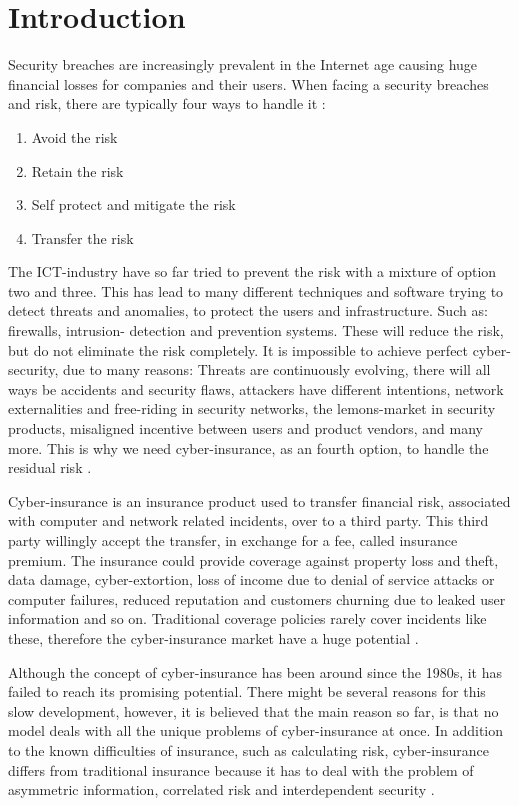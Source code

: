 \section{Introduction}
Security breaches are increasingly prevalent in the Internet age causing huge financial losses
for companies and their users. When facing a security breaches and risk, there are typically four ways to handle it \cite{bolot2008new}:
\begin{enumerate}
\item Avoid the risk
\item Retain the risk
\item Self protect and mitigate the risk
\item Transfer the risk
\end{enumerate}
The ICT-industry have so far tried to prevent the risk with a mixture of option two and three. This has lead to many different techniques and software trying to detect threats and anomalies, to protect the users and infrastructure. Such as: firewalls, intrusion- detection and prevention systems. These will reduce the risk, but do not eliminate the risk completely. It is impossible to achieve perfect cyber-security, due to many reasons: Threats are continuously evolving, there will all ways be accidents and security flaws, attackers have different intentions, network externalities and free-riding in security networks, the lemons-market in security products, misaligned incentive between users and product vendors, and many more. 
This is why we need cyber-insurance, as an fourth option, to handle the residual risk \cite{lelarge2009economic,paldifferentiating}.

Cyber-insurance is an insurance product used to transfer financial risk, associated with computer and network related incidents, over to a third party. This third party willingly accept the transfer, in exchange for a fee, called insurance premium.
The insurance could provide coverage against property loss and theft, data damage, cyber-extortion, loss of income due to denial of service attacks or computer failures, reduced reputation and customers churning due to leaked user information and so on. Traditional coverage policies rarely cover incidents like these, therefore the cyber-insurance market have a huge potential \cite{washingtonpaper}.

Although the concept of cyber-insurance has been around since the 1980s, it has failed to reach its promising potential. There might be several reasons for this slow development, however, it is believed that the main reason so far, is that no model deals with all the unique problems of cyber-insurance at once. In addition to the known difficulties of insurance, such as calculating risk, cyber-insurance differs from traditional insurance because it has to deal with the problem of asymmetric information, correlated risk and interdependent security \cite{networkgames}.  

